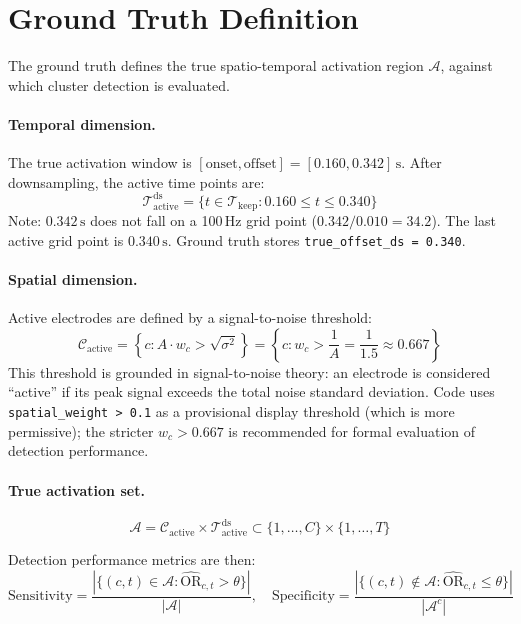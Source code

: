 \documentclass[12pt, a4paper]{article}
\begin{document}
\section{Ground Truth Definition}\label{sec:ground_truth}

The ground truth defines the true spatio-temporal activation region
$\mathcal{A}$, against which cluster detection is evaluated.

\paragraph{Temporal dimension.}
The true activation window is $[\text{onset}, \text{offset}] = [0.160, 0.342]\,\text{s}$.
After downsampling, the active time points are:
%
\[
  \mathcal{T}^\text{ds}_\text{active}
    = \{t \in \mathcal{T}_\text{keep} : 0.160 \le t \le 0.340\}
\]
%
Note: $0.342\,\text{s}$ does not fall on a 100\,Hz grid point
($0.342 / 0.010 = 34.2$).
The last active grid point is $0.340\,\text{s}$.
Ground truth stores \texttt{true\_offset\_ds = 0.340}.

\paragraph{Spatial dimension.}
Active electrodes are defined by a signal-to-noise threshold:
%
\begin{equation}
  \mathcal{C}_\text{active}
    = \left\{c : A \cdot w_c > \sqrt{\sigma^2}\right\}
    = \left\{c : w_c > \frac{1}{A} = \frac{1}{1.5} \approx 0.667\right\}
\end{equation}
%
This threshold is grounded in signal-to-noise theory: an electrode
is considered ``active'' if its peak signal exceeds the total noise standard
deviation.
Code uses \texttt{spatial\_weight > 0.1} as a provisional display threshold
(which is more permissive); the stricter $w_c > 0.667$ is recommended for
formal evaluation of detection performance.

\paragraph{True activation set.}
%
\[
  \mathcal{A}
    = \mathcal{C}_\text{active} \times \mathcal{T}^\text{ds}_\text{active}
    \subset \{1,\ldots,C\} \times \{1,\ldots,T\}
\]

Detection performance metrics are then:
%
\[
  \text{Sensitivity}
    = \frac{|\{(c,t) \in \mathcal{A} : \widehat{\mathrm{OR}}_{c,t} > \theta\}|}
           {|\mathcal{A}|},
  \quad
  \text{Specificity}
    = \frac{|\{(c,t) \notin \mathcal{A} : \widehat{\mathrm{OR}}_{c,t} \le \theta\}|}
           {|\mathcal{A}^c|}
\]
\end{document}
